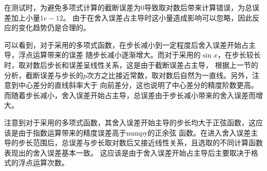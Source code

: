 \documentclass[12pt, a4paper]{article}
\begin{document}
在测试时，为避免多项式计算的截断误差为0导致取对数后带来计算错误，为总误差加上小量$1e-12$。
由于在舍入误差占主导时这小量造成影响可以忽略，因此反应的变化趋势仍是合理的。

可以看到，对于采用的多项式函数，在步长减小到一定程度后舍入误差开始占主导，浮点运算带来的误差
随步长减小逐渐增大。而对于采用的$\sin x$，在步长较长时，取对数后步长和误差呈线性关系，这是由于截断误差占主导，
根据上一节的分析，截断误差与步长的$p$次方之比接近常数，取对数后自然为一直线。另外，注意到中心差分的直线斜率大于
向前差分，这也说明了中心差分的精度阶数更高。而随着步长减小，舍入误差开始占主导，总误差由于步长减小带来的舍入误差而增大。

注意到对于采用的多项式函数，其舍入误差开始主导的步长均大于正弦函数，这应该是由于指数运算带来的精度误差高于numpy的正余弦
函数。在进入舍入误差主导的步长范围后，总误差与步长取对数后又接近线性关系，且选取的不同计算函数表现出的舍入误差基本一致。
这应该是由于舍入误差开始占主导后主要取决于格式的浮点运算次数。
\end{document}
